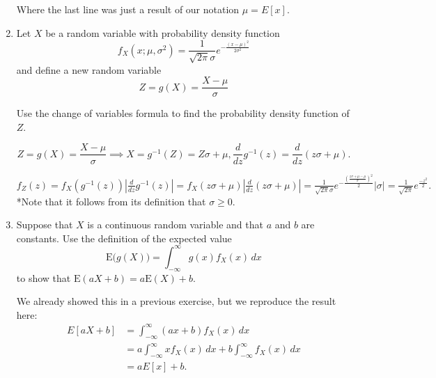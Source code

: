 \documentclass[letterpaper,12pt,fleqn]{article}
\begin{document}
\begin{enumerate}
Where the last line was just a result of our notation $\mu = E[x]$.

\vspace{2em}

\item Let $X$ be a random variable with probability density function
\begin{equation*}
f_{X}(x; \mu, \sigma^{2}) = \frac{1}{\sqrt{2 \pi} \sigma} e^{- \frac{(x - \mu)^{2}}{2 \sigma^{2}}}
\end{equation*}
and define a new random variable
\begin{equation*}
Z = g(X) = \frac{X - \mu}{\sigma}
\end{equation*}

Use the change of variables formula to find the probability density function of $Z$.

\begin{equation*}
Z = g(X) = \frac{X - \mu}{\sigma} \implies X=g^{-1}(Z) = Z\sigma + \mu, \frac{d}{dz} g^{-1}(z) =\frac{d}{dz}(z\sigma + \mu).
\end{equation*}

$f_Z(z) = f_X(g^{-1}(z))|\frac{d}{dz} g^{-1}(z)| = f_X(z\sigma + \mu)|\frac{d}{dz}(z\sigma + \mu)| = \frac{1}{\sqrt{2\pi}\sigma}e^{-\frac{(\frac{z\sigma+\mu - \mu}{\sigma})^2}{2}}|\sigma| = \frac{1}{\sqrt{2\pi}}e^{\frac{-z^2}{2}}.$\\

*Note that it follows from its definition that $\sigma \geq 0$.



\item Suppose that $X$ is a continuous random variable and that $a$ and $b$ are constants.  Use the definition of the expected value
\begin{equation*}
\mbox{E} \big( g(X) \big) = \int_{-\infty}^{\infty} g(x) f_{X}(x) \, dx
\end{equation*}
to show that $\mbox{E}(aX + b) = a \mbox{E}(X) + b$.

We already showed this in a previous exercise, but we reproduce the result here:
\begin{align*}
E[aX+b] &= \int_{-\infty}^{\infty} (ax+b)f_X(x)\,dx \\ &= a\int_{-\infty}^{\infty}xf_X(x) \,dx + b\int_{-\infty}^{\infty} f_X(x)\,dx \\ &= aE[x] + b.
\end{align*}
\end{enumerate}
\end{document}
